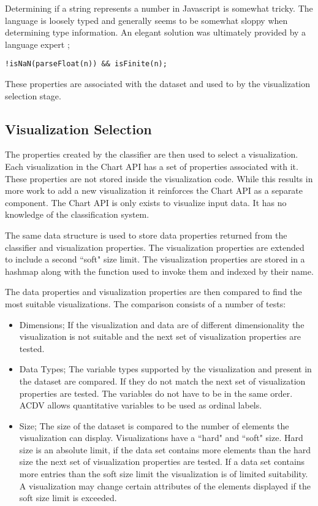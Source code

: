\documentclass[a4paper, 11pt, titlepage, onehalfspacing]{report}
\begin{document}
Determining if a string represents a number in Javascript is somewhat tricky. The language is loosely typed and generally seems to be somewhat sloppy when determining type information. An elegant solution was ultimately provided by a language expert \cite{isnumber}; 
\begin{verbatim}
!isNaN(parseFloat(n)) && isFinite(n);
\end{verbatim}

These properties are associated with the dataset and used to by the visualization selection stage.

\subsection{Visualization Selection}
The properties created by the classifier are then used to select a visualization. Each visualization in the Chart API has a set of properties associated with it. These properties are not stored inside the visualization code. While this results in more work to add a new visualization it reinforces the Chart API as a separate component. The Chart API is only exists to visualize input data. It has no knowledge of the classification system.

The same data structure is used to store data properties returned from the classifier and visualization properties. The visualization properties are extended to include a second ``soft" size limit. The visualization properties are stored in a hashmap along with the function used to invoke them and indexed by their name. 

The data properties and visualization properties are then compared to find the most suitable visualizations. The comparison consists of a number of tests:
\begin{itemize}
\item Dimensions; If the visualization and data are of different dimensionality the visualization is not suitable and the next set of visualization properties are tested.
\item Data Types; The variable types supported by the visualization and present in the dataset are compared. If they do not match the next set of visualization properties are tested. The variables do not have to be in the same order. AC\lightning{}DV allows quantitative variables to be used as ordinal labels.
\item Size; The size of the dataset is compared to the number of elements the visualization can display. Visualizations have a ``hard" and ``soft" size. Hard size is an absolute limit, if the data set contains more elements than the hard size the next set of visualization properties are tested. If a data set contains more entries than the soft size limit the visualization is of limited suitability. A visualization may change certain attributes of the elements displayed if the soft size limit is exceeded.
\end{itemize}
\end{document}
